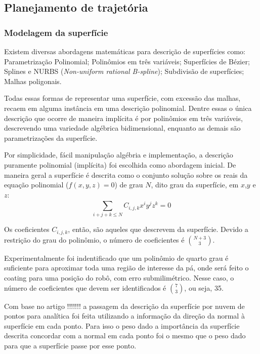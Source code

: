 \subsection{Planejamento de trajetória}

\subsubsection{Modelagem da superfície}\label{modelagem}

%





Existem diversas abordagens matemáticas para descrição de superfícies como:
Parametrização Polinomial; Polinômios em três variáveis; Superfícies de
Bézier; Splines e NURBS (\textit{Non-uniform rational B-spline}); Subdivisão de
superfícies; Malhas poligonais.

Todas essas formas de representar uma superfície, com excessão das malhas,
recaem em alguma instância em uma descrição polinomial. Dentre essas o única
descrição que ocorre de maneira implícita é por polinômios em três variáveis,
descrevendo uma variedade algébrica bidimensional, enquanto as demais são
parametrizações da superfície. 

Por simplicidade, fácil manipulação algébria e implementação, a descrição
puramente polinomial (implícita) foi escolhida como abordagem inicial. De
maneira geral a superfície é descrita como o conjunto solução sobre os
reais da equação polinomial ($f(x,y,z)=0$) de grau $N$, dito grau da
superfície, em $x$,$y$ e $z$:
\[\sum\limits_{i+j+k \leq N}^{} C_{i,j,k}x^iy^jz^k = 0\]

Os coeficientes $C_{i,j,k}$, então, são aqueles que descrevem da superfície.
Devido a restrição do grau do polinômio, o número de coeficientes é
$\binom{N+3}{3}$.

Experimentalmente foi indentificado que um polinômio de quarto grau é suficiente
para aproximar toda uma região de interesse da pá, onde será feito o coating
para uma posição do robô, com erro submilimétrico. Nesse caso, o número de
coeficientes que devem ser identificados é $\binom{7}{3}$, ou seja, 35.

Com base no artigo !!!!!!! a passagem da descrição da superfície por nuvem de
pontos para analítica foi feita utilizando a informação da direção da normal à
superfície em cada ponto. Para isso o peso dado a importância da superfície
descrita concordar com a normal em cada ponto foi o mesmo que o peso dado para
que a superfície passe por esse ponto.

